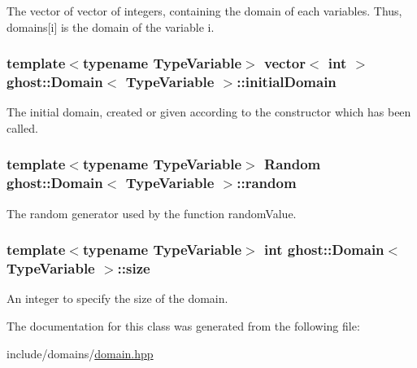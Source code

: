 The vector of vector of integers, containing the domain of each variables. Thus, domains\mbox{[}i\mbox{]} is the domain of the variable i. 

\hypertarget{classghost_1_1Domain_a8890ca1323c293a4a1e2aa1830eff043}{
\subsubsection[{initial\-Domain}]{\setlength{\rightskip}{0pt plus 5cm}template$<$typename Type\-Variable$>$ vector$<$ int $>$ {\bf ghost\-::\-Domain}$<$ Type\-Variable $>$\-::initial\-Domain\hspace{0.3cm}{\ttfamily [protected]}}}\label{classghost_1_1Domain_a8890ca1323c293a4a1e2aa1830eff043}


The initial domain, created or given according to the constructor which has been called. 

\hypertarget{classghost_1_1Domain_ab6a7a58f8a147f5b2b475e106627fad2}{
\subsubsection[{random}]{\setlength{\rightskip}{0pt plus 5cm}template$<$typename Type\-Variable$>$ {\bf Random} {\bf ghost\-::\-Domain}$<$ Type\-Variable $>$\-::random\hspace{0.3cm}{\ttfamily [protected]}}}\label{classghost_1_1Domain_ab6a7a58f8a147f5b2b475e106627fad2}


The random generator used by the function random\-Value. 

\hypertarget{classghost_1_1Domain_a13e282f60c6c7cddf5b5716b45ad161c}{
\subsubsection[{size}]{\setlength{\rightskip}{0pt plus 5cm}template$<$typename Type\-Variable$>$ int {\bf ghost\-::\-Domain}$<$ Type\-Variable $>$\-::size\hspace{0.3cm}{\ttfamily [protected]}}}\label{classghost_1_1Domain_a13e282f60c6c7cddf5b5716b45ad161c}


An integer to specify the size of the domain. 



The documentation for this class was generated from the following file\-:\begin{DoxyCompactItemize}
\item 
include/domains/\hyperlink{domain_8hpp}{domain.\-hpp}\end{DoxyCompactItemize}

